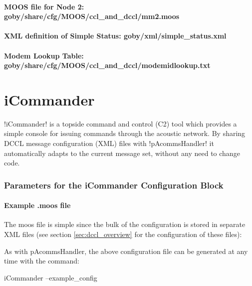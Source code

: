 \paragraph{MOOS file for Node 2: goby/share/cfg/MOOS/ccl\_and\_dccl/mm2.moos}
\resetbvlinenumber

\paragraph{XML definition of Simple Status: goby/xml/simple\_status.xml}
\resetbvlinenumber

\paragraph{Modem Lookup Table: goby/share/cfg/MOOS/ccl\_and\_dccl/modemidlookup.txt}
\resetbvlinenumber

\section{iCommander}\label{sec:icommander} 

!iCommander! is a topside command and control (C2) tool which provides a simple
console for issuing commands through the acoustic network. By sharing
DCCL message configuration (XML) files with !pAcommsHandler! it automatically adapts to the current message set,
without any need to change code.

\subsubsection{Parameters for the iCommander Configuration Block}
\paragraph{Example .moos file}
The moos file is simple since the bulk of the configuration is stored in separate XML files (see section \ref{sec:dccl_overview} for the configuration of these files):

\resetbvlinenumber
As with pAcommsHandler, the above configuration file can be generated at any time with the command:
\begin{boxedverbatim}
iCommander --example_config
\end{boxedverbatim}
\resetbvlinenumber


